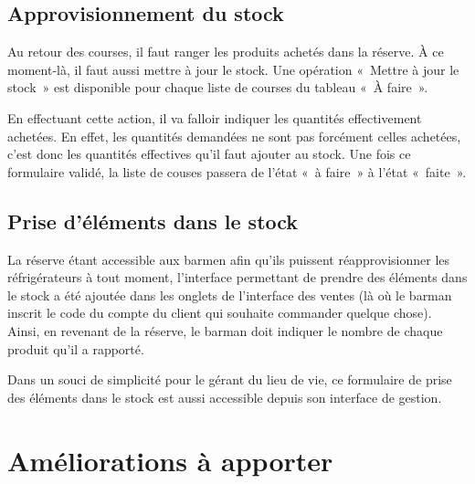 \documentclass[a4paper]{report}
\begin{document}
\subsection{Approvisionnement du stock}
\par Au retour des courses, il faut ranger les produits achetés dans la réserve. À ce moment-là, il faut aussi mettre à jour le stock. Une opération « Mettre à jour le stock » est disponible pour chaque liste de courses du tableau « À faire ». 
\par En effectuant cette action, il va falloir indiquer les quantités effectivement achetées. En effet, les quantités demandées ne sont pas forcément celles achetées, c’est donc les quantités effectives qu’il faut ajouter au stock. Une fois ce formulaire validé, la liste de couses passera de l’état « à faire » à l’état « faite ».

\subsection{Prise d’éléments dans le stock}
\par La réserve étant accessible aux barmen afin qu’ils puissent réapprovisionner les réfrigérateurs à tout moment, l’interface permettant de prendre des éléments dans le stock a été ajoutée dans les onglets de l’interface des ventes (là où le barman inscrit le code du compte du client qui souhaite commander quelque chose). Ainsi, en revenant de la réserve, le barman doit indiquer le nombre de chaque produit qu’il a rapporté.
\par Dans un souci de simplicité pour le gérant du lieu de vie, ce formulaire de prise des éléments dans le stock est aussi accessible depuis son interface de gestion. 


\section{Améliorations à apporter}
\label{sec:amelioration_a_apporter}
\end{document}
